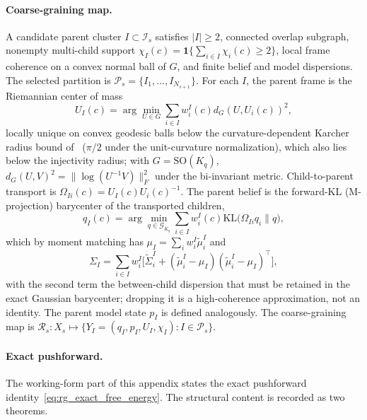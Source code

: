 \documentclass[11pt]{article}
\begin{document}
\paragraph{Coarse-graining map.}
A candidate parent cluster $I \subset \mathcal{I}_s$ satisfies $|I| \ge 2$, connected overlap subgraph, nonempty multi-child support $\chi_I(c) = \mathbf{1}\{\sum_{i \in I}\chi_i(c) \ge 2\}$, local frame coherence on a convex normal ball of $G$, and finite belief and model dispersions. The selected partition is $\mathcal{P}_s = \{I_1, \ldots, I_{N_{s+1}}\}$. For each $I$, the parent frame is the Riemannian center of mass
\begin{equation}
U_I(c) = \arg\min_{U \in G} \sum_{i \in I} w_i^I(c) d_G(U, U_i(c))^2,
\end{equation}
locally unique on convex geodesic balls below the curvature-dependent Karcher radius bound of~\cite{Karcher1977} ($\pi/2$ under the unit-curvature normalization), which also lies below the injectivity radius; with $G = \mathrm{SO}(K_q)$, $d_G(U, V)^2 = \|\log(U^{-1}V)\|_F^2$ under the bi-invariant metric. Child-to-parent transport is $\Omega_{Ii}(c) = U_I(c)U_i(c)^{-1}$. The parent belief is the forward-KL (M-projection) barycenter of the transported children,
\begin{equation}
q_I(c) = \arg\min_{q \in \mathcal{G}_{K_q}} \sum_{i \in I} w_i^I(c) \mathrm{KL}\big(\Omega_{Ii}q_i \| q\big),
\end{equation}
which by moment matching has $\mu_I = \sum_i w_i^I \widetilde{\mu}_i^I$ and
\begin{equation}
\Sigma_I = \sum_{i \in I} w_i^I\big[\widetilde{\Sigma}_i^I + (\widetilde{\mu}_i^I - \mu_I)(\widetilde{\mu}_i^I - \mu_I)^\top\big],
\end{equation}
with the second term the between-child dispersion that must be retained in the exact Gaussian barycenter; dropping it is a high-coherence approximation, not an identity. The parent model state $p_I$ is defined analogously. The coarse-graining map is $\mathcal{R}_s : X_s \mapsto \{Y_I = (q_I, p_I, U_I, \chi_I) : I \in \mathcal{P}_s\}$.

\paragraph{Exact pushforward.}
The working-form part of this appendix states the exact pushforward identity~\eqref{eq:rg_exact_free_energy}. The structural content is recorded as two theorems.
\end{document}
